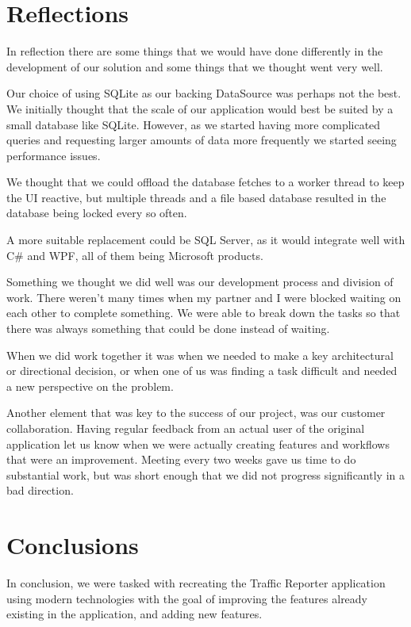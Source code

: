 \documentclass{article}
\begin{document}
\section{Reflections}
In reflection there are some things that we would have done differently in the development of our solution and some things that we thought went very well.

Our choice of using SQLite as our backing DataSource was perhaps not the best. We initially thought that the scale of our application would best be suited by a small database like SQLite. However, as we started having more complicated queries and requesting larger amounts of data more frequently we started seeing performance issues. 

We thought that we could offload the database fetches to a worker thread to keep the UI reactive, but multiple threads and a file based database resulted in the database being locked every so often. 

A more suitable replacement could be SQL Server, as it would integrate well with C\# and WPF, all of them being Microsoft products.

Something we thought we did well was our development process and division of work. There weren't many times when my partner and I were blocked waiting on each other to complete something. We were able to break down the tasks so that there was always something that could be done instead of waiting. 

When we did work together it was when we needed to make a key architectural or directional decision, or when one of us was finding a task difficult and needed a new perspective on the problem.

Another element that was key to the success of our project, was our customer collaboration. Having regular feedback from an actual user of the original application let us know when we were actually creating features and workflows that were an improvement. Meeting every two weeks gave us time to do substantial work, but was short enough that we did not progress significantly in a bad direction.

\section{Conclusions}

In conclusion, we were tasked with recreating the Traffic Reporter application using modern technologies with the goal of improving the features already existing in the application, and adding new features. 
\end{document}
